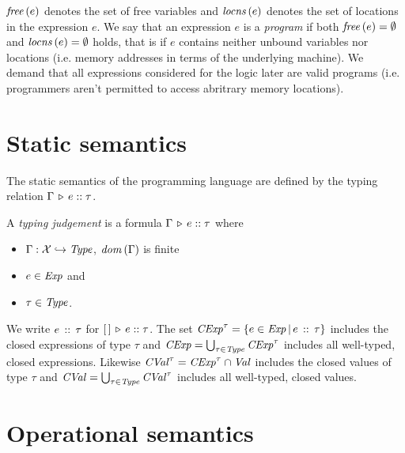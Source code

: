 \documentclass[12pt,a4paper]{report}
\newcommand{\CExp}{\nstyle{CExp}}
\newcommand{\CVal}{\nstyle{CVal}}
\begin{document}
$\mathit{free}\,(e)$ denotes the set of free variables and $\mathit{locns}\,(e)$ denotes the set of locations in the
expression $e$. We say that an expression $e$ is a {\em program} if both $\mathit{free}\,(e)=\emptyset$
and $\mathit{locns}\,(e)=\emptyset$ holds, that is if $e$ contains neither unbound variables nor
locations (i.e. memory addresses in terms of the underlying machine). We demand that all expressions
considered for the logic later are valid programs (i.e. programmers aren't permitted to access
abritrary memory locations).



\section{Static semantics}

The static semantics of the programming language are defined by the typing relation
$\Gamma\,\triangleright\,e\mathrel{::}\tau$.

\begin{definition}
  A {\em typing judgement} is a formula $\Gamma\,\triangleright\,e\mathrel{::}\tau$ where
  \begin{itemize}
    \item $\Gamma:\mathcal{X} \hookrightarrow \mathit{Type}$, $\mathit{dom}\,(\Gamma)$ is finite
    \item $e\in\mathit{Exp}$ and
    \item $\tau\in\mathit{Type}$.
  \end{itemize}
\end{definition}

We write $e\,\mathrel{::}\,\tau$ for $[\,]\,\triangleright\,e\mathrel{::}\tau$. The set $\CExp^\tau = \{e\in\Exp\,|\,\tj{e}{\tau}\}$
includes the closed expressions of type $\tau$ and $\CExp = \bigcup_{\tau\in\Type} \CExp^\tau$ includes
all well-typed, closed expressions. Likewise $\CVal^\tau = \CExp^\tau \cap \Val$ includes
the closed values of type $\tau$ and $\CVal = \bigcup_{\tau\in\Type} \CVal^\tau$ includes all well-typed,
closed values.



\section{Operational semantics}
\end{document}
